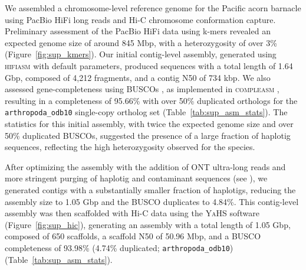 \documentclass[11pt]{article}
\begin{document}

We assembled a chromosome-level reference genome for the Pacific acorn barnacle
using PacBio HiFi long reads and Hi-C chromosome conformation capture. Preliminary
assessment of the PacBio HiFi data using k-mers revealed an expected genome size
of around 845 Mbp, with a heterozygosity of over 3\% (Figure~\ref{fig:sup_kmers}).
Our initial contig-level assembly, generated using \textsc{hifiasm}
\citep{cheng_haplotype-resolved_2021,cheng_haplotype-resolved_2022} with
default parameters, produced sequences with a total length of 1.64 Gbp,
composed of 4,212 fragments, and a contig N50 of 734 kbp. We also assessed
gene-completeness using \textsc{BUSCO}s \citep{simao_busco_2015,manni_busco_2021,
tegenfeldt_orthodb_2025}, as implemented in \textsc{compleasm}
\citep{huang_compleasm_2023}, resulting in a completeness of 95.66\%
with over 50\% duplicated orthologs
for the \texttt{arthropoda\_odb10} single-copy ortholog set
(Table~\ref{tab:sup_asm_stats}). The statistics for this initial assembly, with
twice the expected genome size and over 50\% duplicated \textsc{BUSCO}s,
suggested the presence of a large fraction of haplotig sequences, reflecting
the high heterozygosity observed for the species.
\vspace{0.2cm}

After optimizing the assembly with the addition of ONT ultra-long reads and more stringent
purging of haplotig and contaminant sequences (see ), we
generated contigs with a substantially smaller fraction of haplotigs, reducing the
assembly size to 1.05 Gbp and the \textsc{BUSCO} duplicates to 4.84\%.
This contig-level assembly was then scaffolded with Hi-C data using the \textsc{YaHS}
software \citep{zhou_yahs_2023} (Figure~\ref{fig:sup_hic}), generating an assembly
with a total length of 1.05 Gbp, composed of 650 scaffolds, a scaffold N50
of 50.96 Mbp, and a \textsc{BUSCO} completeness of 93.98\% (4.74\% duplicated;
\texttt{arthropoda\_odb10}) (Table~\ref{tab:sup_asm_stats}).
\vspace{0.2cm}
\end{document}
